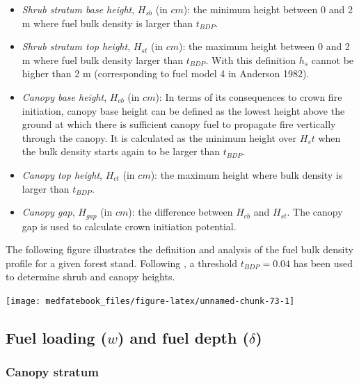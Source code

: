 \documentclass[]{book}
\providecommand{\tightlist}{%
  \setlength{\itemsep}{0pt}\setlength{\parskip}{0pt}}
\begin{document}
\begin{itemize}
\tightlist
\item
  \emph{Shrub stratum base height}, \(H_{sb}\) (in \(cm\)): the minimum
  height between 0 and 2 m where fuel bulk density is larger than
  \(t_{BDP}\).
\item
  \emph{Shrub stratum top height}, \(H_{st}\) (in \(cm\)): the maximum
  height between 0 and 2 m where fuel bulk density larger than
  \(t_{BDP}\). With this definition \(h_{s}\) cannot be higher than 2 m
  (corresponding to fuel model 4 in Anderson 1982).
\item
  \emph{Canopy base height}, \(H_{cb}\) (in \(cm\)): In terms of its
  consequences to crown fire initiation, canopy base height can be
  defined as the lowest height above the ground at which there is
  sufficient canopy fuel to propagate fire vertically through the
  canopy. It is calculated as the minimum height over \(H_st\) when the
  bulk density starts again to be larger than \(t_{BDP}\).
\item
  \emph{Canopy top height}, \(H_{ct}\) (in \(cm\)): the maximum height
  where bulk density is larger than \(t_{BDP}\).
\item
  \emph{Canopy gap}, \(H_{gap}\) (in \(cm\)): the difference between
  \(H_{cb}\) and \(H_{st}\). The canopy gap is used to calculate crown
  initiation potential.
\end{itemize}

The following figure illustrates the definition and analysis of the fuel
bulk density profile for a given forest stand. Following
\citet{Mitsopoulos2007}, a threshold \(t_{BDP} = 0.04\) has been used to
determine shrub and canopy heights.

\begin{center}\texttt{[image: medfatebook\_files/figure-latex/unnamed-chunk-73-1]} \end{center}

\subsection{\texorpdfstring{Fuel loading (\(w\)) and fuel depth
(\(\delta\))}{Fuel loading (w) and fuel depth (\textbackslash{}delta)}}\label{fuel-loading-w-and-fuel-depth-delta}

\subsubsection{Canopy stratum}\label{canopy-stratum}
\end{document}
